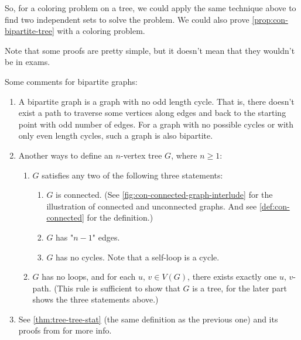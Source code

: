 \documentclass[../src/handouts/main.tex]{subfiles}
\begin{document}
So, for a coloring problem on a tree, we could apply the same technique above to find two independent sets to solve the problem. We could also prove \cref{prop:con-bipartite-tree} with a coloring problem. %

Note that some proofs are pretty simple, but it doesn't mean that they wouldn't be in exams.

Some comments for bipartite graphs:
\begin{enumerate}
  \item \label{enum:con-bipartite-odd} A bipartite graph is a graph with no odd length cycle. That is, there doesn't exist a path to traverse some vertices along edges and back to the starting point with odd number of edges. For a graph with no possible cycles or with only even length cycles, such a graph is also bipartite. 

  \item \label{enum:con-tree-state} Another ways to define an $n$-vertex tree $G$, where $n \geq 1$:
        \begin{enumerate}
          \item $G$ satisfies any two of the following three statements:
                \begin{enumerate}
                  \item $G$ is connected. (See \cref{fig:con-connected-graph-interlude} for the illustration of connected and unconnected graphs. And see \cref{def:con-connected} for the definition.)
                  \item $G$ has "$n - 1$" edges.
                  \item $G$ has no cycles. Note that a self-loop is a cycle.
                \end{enumerate}
          \item $G$ has no loops, and for each $u,\, v \in V(G)$, there exists exactly one $u,\, v$-path. (This rule is sufficient to show that $G$ is a tree, for the later part shows the three statements above.)
        \end{enumerate}

  \item See \cref{thm:tree-tree-stat} (the same definition as the previous one) and its proofs from  for more info.
\end{enumerate}
\end{document}
